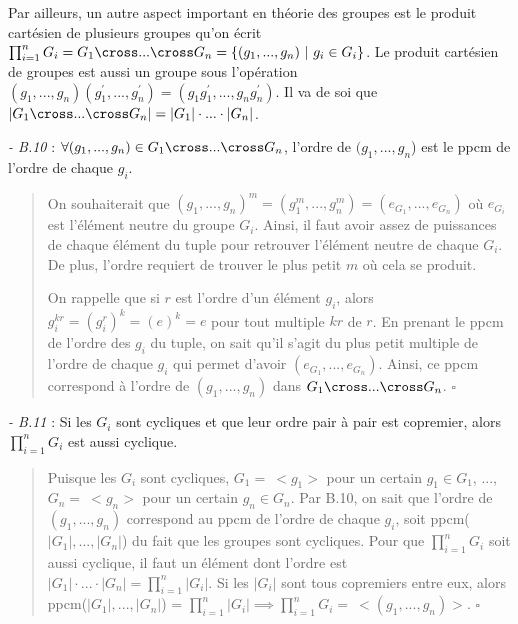 Par ailleurs, un autre aspect important en théorie des groupes est le produit cartésien de plusieurs groupes qu'on écrit $\prod_{i=1}^{n} G_i = G_1 \cross ... \cross G_n = \{(g_1, ..., g_n) \ | \ g_i \in G_i\}$. Le produit cartésien de groupes est aussi un groupe sous l'opération $(g_1, ..., g_n)(g^{'}_1, ..., g^{'}_n) = (g_1g^{'}_1, ..., g_ng^{'}_n)$. Il va de soi que $|G_1 \cross ... \cross G_n| = |G_1| \cdot ... \cdot |G_n|$.

\textit{- B.10} : $\forall (g_1, ..., g_n) \in G_1 \cross ... \cross G_n$, l'ordre de $(g_1, ..., g_n$) est le ppcm de l'ordre de chaque $g_i$. 

\begin{quote}
    On souhaiterait que $(g_1, ..., g_n)^m = (g_1^m, ..., g_n^m) = (e_{G_1}, ..., e_{G_n})$ où $e_{G_i}$ est l'élément neutre du groupe $G_i$. Ainsi, il faut avoir assez de puissances de chaque élément du tuple pour retrouver l'élément neutre de chaque $G_i$. De plus, l'ordre requiert de trouver le plus petit $m$ où cela se produit. 
    
    On rappelle que si $r$ est l'ordre d'un élément $g_i$, alors $g_i^{kr} = \left(g_i^r\right)^k = \left(e\right)^k = e$ pour tout multiple $kr$ de $r$. En prenant le ppcm de l'ordre des $g_i$ du tuple, on sait qu'il s'agit du plus petit multiple de l'ordre de chaque $g_i$ qui permet d'avoir $(e_{G_1}, ..., e_{G_n})$. Ainsi, ce ppcm correspond à l'ordre de $(g_1, ..., g_n)$ dans  $G_1 \cross ... \cross G_n$. $\square$
\end{quote}

\textit{- B.11} : Si les $G_i$ sont cycliques et que leur ordre pair à pair est copremier, alors $\prod_{i=1}^{n} G_i$ est aussi cyclique.

\begin{quote}
    Puisque les $G_i$ sont cycliques, $G_1 = \ <g_1>$ pour un certain $g_1 \in G_1$, ..., $G_n = \ <g_n>$ pour un certain $g_n \in G_n$. Par B.10, on sait que l'ordre de $(g_1, ..., g_n)$ correspond au ppcm de l'ordre de chaque $g_i$, soit ppcm($|G_1|, ..., |G_n|$) du fait que les groupes sont cycliques. Pour que $\prod_{i=1}^{n} G_i$ soit aussi cyclique, il faut un élément dont l'ordre est $|G_1| \cdot ... \cdot |G_n| = \prod_{i=1}^{n}|G_i|$. Si les $|G_i|$ sont tous copremiers entre eux, alors ppcm($|G_1|, ..., |G_n|$) = $\prod_{i=1}^{n}|G_i| \implies \prod_{i=1}^{n}G_i = \ <(g_1, ..., g_n)>$. $\square$
\end{quote}